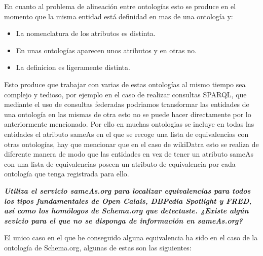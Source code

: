 \documentclass[spanish]{llncs}   %
\begin{document}
En cuanto al problema de alineación entre ontologías esto se produce en el momento que la misma entidad está definidad en mas de una ontología y:
\begin{itemize}
    \item La nomenclatura de los atributos es distinta.
    \item En unas ontologías aparecen unos atributos y en otras no.
    \item La definicion es ligeramente distinta.
\end{itemize}
Esto produce que trabajar con varias de estas ontologías al mismo tiempo sea complejo y tedioso, por ejemplo en el caso de realizar consultas SPARQL, 
que mediante el uso de consultas federadas podriamos transformar las entidades de una ontología en las mismas de otra esto no se puede hacer directamente 
por lo anteriormente mencionado. Por ello en muchas ontologias se incluye en todas las entidades el atributo sameAs en el que se recoge una lista de equivalencias 
con otras ontologías, hay que mencionar que en el caso de wikiDatra esto se realiza de diferente manera de modo que las entidades en vez de tener un 
atributo sameAs con una lista de equivalencias poseen un atributo de equivalencia por cada ontología que tenga registrada para ello.

\textbf{\textit{Utiliza el servicio sameAs.org para localizar equivalencias para todos los tipos fundamentales de Open Calais, DBPedia 
Spotlight y FRED, así como los homólogos de Schema.org que detectaste. ¿Existe algún sevicio para el que no se disponga de información 
en sameAs.org?}}

El unico caso en el que he conseguido alguna equivalencia ha sido en el caso de la ontología de Schema.org, algunas de estas son las siguientes:
\end{document}
